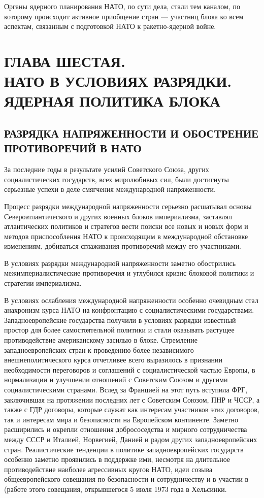 \documentclass[12pt, a4paper, openany]{book}
\begin{document}
	Органы ядерного планирования НАТО, по сути дела, стали тем каналом, по которому происходит активное приобщение стран — участниц блока ко всем аспектам, связанным с подготовкой НАТО к ракетно-ядерной войне.
	
					\newpage
	\section[Глава шестая. НАТО В УСЛОВИЯХ РАЗРЯДКИ. ЯДЕРНАЯ ПОЛИТИКА БЛОКА]{\center ГЛАВА ШЕСТАЯ.\\ \textbf{НАТО В УСЛОВИЯХ РАЗРЯДКИ. ЯДЕРНАЯ ПОЛИТИКА БЛОКА}}	
	\subsection[Разрядка напряженности и обострение противоречий в НАТО]{\center РАЗРЯДКА НАПРЯЖЕННОСТИ И ОБОСТРЕНИЕ ПРОТИВОРЕЧИЙ В НАТО}	
	
	
	За последние годы в результате усилий Советского Союза, других социалистических государств, всех миролюбивых сил, были достигнуты серьезные успехи в деле смягчения международной напряженности.
	
	Процесс разрядки международной напряженности серьезно расшатывал основы Североатлантического и других военных блоков империализма, заставлял атлантических политиков и стратегов вести поиски все новых и новых форм и методов приспособления НАТО к происходящим в международной обстановке изменениям, добиваться сглаживания противоречий между его участниками.
	
	В условиях разрядки международной напряженности заметно обострились межимпериалистические противоречия и углубился кризис блоковой политики и стратегии империализма.
	
	В условиях ослабления международной напряженности особенно очевидным стал анахронизм курса НАТО на конфронтацию с социалистическими государствами. Западноевропейские государства получили в условиях разрядки известный простор для более самостоятельной политики и стали оказывать растущее противодействие американскому засилью в блоке. Стремление западноевропейских стран к проведению более независимого внешнеполитического курса отчетливее всего выразилось в признании необходимости переговоров и соглашений с социалистической частью Европы, в нормализации и улучшении отношений с Советским Союзом и другими социалистическими странами. Вслед за Францией на этот путь вступила ФРГ, заключившая на протяжении последних лет с Советским Союзом, ПНР и ЧССР, а также с ГДР договоры, которые служат как интересам участников этих договоров, так и интересам мира и безопасности на Европейском континенте. Заметно расширились и окрепли отношения добрососедства и мирного сотрудничества между СССР и Италией, Норвегией, Данией и радом других западноевропейских стран. Реалистические тенденции в политике западноевропейских государств особенно заметно проявились в поддержке ими, несмотря на длительное противодействие наиболее агрессивных кругов НАТО, идеи созыва общеевропейского совещания по безопасности и сотрудничеству и в участии в (работе этого совещания, открывшегося 5 июля 1973 года в Хельсинки.
	
\end{document}
